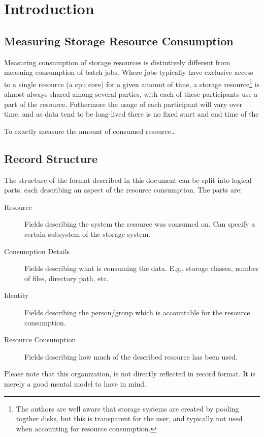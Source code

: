\section{Introduction}


\subsection{Measuring Storage Resource Consumption}

Measuring consumption of storage resources is distintively different from
measuing consumption of batch jobs. Where jobs typically have exclusive access
to a single resource (a cpu core) for a given amount of time, a storage
resource\footnote{The authors are well aware that storage systems are created
by pooling togther disks, but this is transparent for the user, and typically
not used when accounting for resource consumption.} is almost always shared
among several parties, with each of these participants use a part of the
resource. Futhermore the usage of each participant will vary over time, and as
data tend to be long-lived there is no fixed start and end time of the 

To exactly measure the amount of consumed resource\ldots



\subsection{Record Structure}

The structure of the format described in this document can be split into
logical parts, each describing an aspect of the resource consumption. The parts
are:

\begin{description}

\item[Resource] Fields describing the system the resource was consumed on. Can
specify a certain subsystem of the storage system.

\item[Consumption Details] Fields describing what is consuming the data. E.g.,
storage classes, number of files, directory path, etc.

\item[Identity] Fields describing the person/group which is accountable for the
resource consumption.

\item[Resource Consumption] Fields describing how much of the described
resource has been used.

\end{description}

Please note that this organization, is not directly reflected in record format.
It is merely a good mental model to have in mind.


